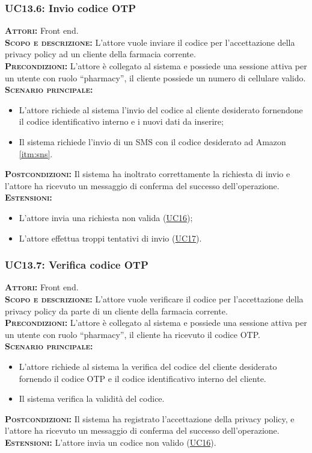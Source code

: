 \subsubsection{UC13.6: Invio codice OTP}
\label{sec:UC136}
\textsc{\textbf{Attori:}} Front end.\\
\textsc{\textbf{Scopo e descrizione:}} L'attore vuole inviare il codice per l'accettazione della privacy policy ad un cliente della farmacia corrente.\\
\textsc{\textsc{\textbf{Precondizioni:}}} L'attore è collegato al sistema e possiede una sessione attiva per un utente con ruolo ``pharmacy'', il cliente possiede un numero di cellulare valido.\\
\textsc{\textbf{Scenario principale:}} 
\begin{itemize}
    \item L'attore richiede al sistema l'invio del codice al cliente desiderato fornendone il codice identificativo interno e i nuovi dati da inserire;
    \item Il sistema richiede l'invio di un SMS con il codice desiderato ad Amazon \ref{itm:sns}.
\end{itemize}
\textsc{\textbf{Postcondizioni:}} Il sistema ha inoltrato correttamente la richiesta di invio e l'attore ha ricevuto un messaggio di conferma del successo dell'operazione.\\
\textsc{\textbf{Estensioni:}} \begin{itemize}
    \item L'attore invia una richiesta non valida (\hyperref[sec:UC16]{UC16});
    \item L'attore effettua troppi tentativi di invio (\hyperref[sec:UC17]{UC17}).
\end{itemize}

\subsubsection{UC13.7: Verifica codice OTP}
\label{sec:UC137}
\textsc{\textbf{Attori:}} Front end.\\
\textsc{\textbf{Scopo e descrizione:}} L'attore vuole verificare il codice per l'accettazione della privacy policy da parte di un cliente della farmacia corrente.\\
\textsc{\textsc{\textbf{Precondizioni:}}} L'attore è collegato al sistema e possiede una sessione attiva per un utente con ruolo ``pharmacy'', il cliente ha ricevuto il codice OTP.\\
\textsc{\textbf{Scenario principale:}} \begin{itemize}
    \item L'attore richiede al sistema la verifica del codice del cliente desiderato fornendo il codice OTP e il codice identificativo interno del cliente.
    \item Il sistema verifica la validità del codice.
\end{itemize}
\textsc{\textbf{Postcondizioni:}} Il sistema ha registrato l'accettazione della privacy policy, e l'attore ha ricevuto un messaggio di conferma del successo dell'operazione.\\
\textsc{\textbf{Estensioni:}} L'attore invia un codice non valido (\hyperref[sec:UC16]{UC16}).

